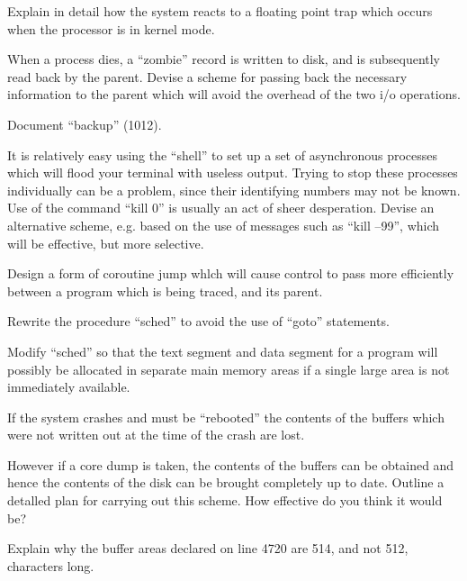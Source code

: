 
\bd
\item[2.1] Explain in detail how the system
reacts to a floating point trap which
occurs when the processor is in kernel
mode.

\item[2.2] When a process dies, a ``zombie''
record is written to disk, and is
subsequently read back by the parent. Devise a scheme for passing back the
necessary information to the parent
which will avoid the overhead of the
two i/o operations.

\item[2.3] Document ``backup'' (1012).

\item[2.4] It is relatively easy using the
``shell'' to set up a set of asynchronous
processes which will flood your terminal with useless output. Trying to stop
these processes individually can be a
problem, since their identifying
numbers may not be known. Use of the
command ``kill 0'' is usually an act of
sheer desperation. Devise an alternative scheme, e.g. based on the use of
messages such as ``kill --99'', which will
be effective, but more selective.

\item[2.5] Design a form of coroutine jump
whlch will cause control to pass more
efficiently between a program which is
being traced, and its parent.
\ed


\bd
\item[3.1] Rewrite the procedure ``sched'' to
avoid the use of ``goto'' statements.

\item[3.2] Modify ``sched'' so that the text
segment and data segment for a program
will possibly be allocated in separate
main memory areas if a single large
area is not immediately available.

\item[3.3] If the system crashes and must be
``rebooted'' the contents of the buffers
which were not written out at the time
of the crash are lost.

However if a core dump is taken,
the contents of the buffers can be
obtained and hence the contents of the
disk can be brought completely up to
date. Outline a detalled plan for carrying out this scheme.
How effective do you think it would be?

\item[3.4] Explain why the buffer areas
declared on line 4720 are 514, and not
512, characters long.

